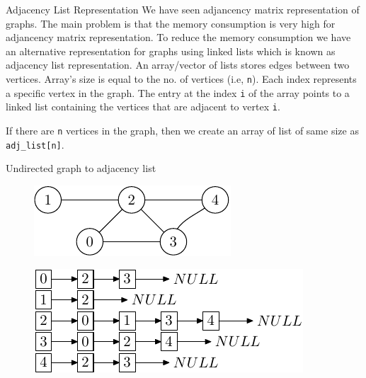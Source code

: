 \documentclass[aspectratio=169,8pt]{beamer}
\begin{document}
\begin{frame}{Adjacency List Representation}
  We have seen adjancency matrix representation of graphs. The main problem is that the memory consumption
  is very high for adjancency matrix representation. To reduce the memory consumption we have an alternative
  representation for graphs using linked lists which is known as adjacency list representation.
  \vspace*{0.5cm}
  An array/vector of lists stores edges between two vertices. Array's size is equal to the
  no. of vertices (i.e, {\tt n}). Each index represents a specific vertex in the graph. The
  entry at the index {\tt i} of the array points to a linked list containing the vertices that are adjacent to
  vertex {\tt i}.

  If there are {\tt n} vertices in the graph, then we create an array of list of same size as {\tt
    adj\_list[n]}.
\end{frame}
\begin{frame}[fragile]{Undirected graph to adjacency list}
  \begin{center}
    \begin{figure}
      \includegraphics{und-graph}
    \end{figure}
    \begin{figure}
      \includegraphics{und-adj-list}
    \end{figure}
  \end{center}
\end{frame}
\end{document}
